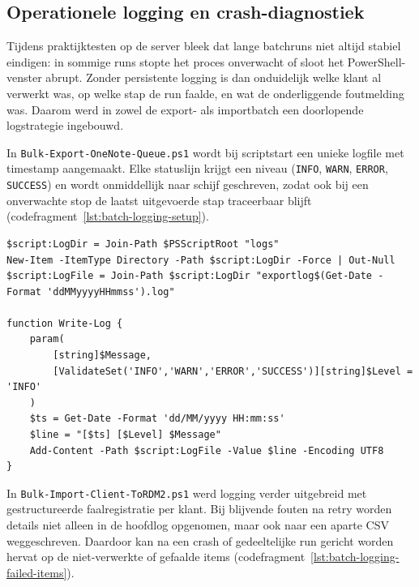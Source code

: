 \subsection{Operationele logging en crash-diagnostiek}
\label{subsec:topic-logging-crash}

Tijdens praktijktesten op de server bleek dat lange batchruns niet altijd stabiel eindigen: in sommige runs stopte het proces onverwacht of sloot het PowerShell-venster abrupt. Zonder persistente logging is dan onduidelijk welke klant al verwerkt was, op welke stap de run faalde, en wat de onderliggende foutmelding was. Daarom werd in zowel de export- als importbatch een doorlopende logstrategie ingebouwd.

In \texttt{Bulk-Export-OneNote-Queue.ps1} wordt bij scriptstart een unieke logfile met timestamp aangemaakt. Elke statuslijn krijgt een niveau (\texttt{INFO}, \texttt{WARN}, \texttt{ERROR}, \texttt{SUCCESS}) en wordt onmiddellijk naar schijf geschreven, zodat ook bij een onverwachte stop de laatst uitgevoerde stap traceerbaar blijft (codefragment~\ref{lst:batch-logging-setup}).

\begin{listing}[htbp]
\begin{lstlisting}
$script:LogDir = Join-Path $PSScriptRoot "logs"
New-Item -ItemType Directory -Path $script:LogDir -Force | Out-Null
$script:LogFile = Join-Path $script:LogDir "exportlog$(Get-Date -Format 'ddMMyyyyHHmmss').log"

function Write-Log {
    param(
        [string]$Message,
        [ValidateSet('INFO','WARN','ERROR','SUCCESS')][string]$Level = 'INFO'
    )
    $ts = Get-Date -Format 'dd/MM/yyyy HH:mm:ss'
    $line = "[$ts] [$Level] $Message"
    Add-Content -Path $script:LogFile -Value $line -Encoding UTF8
}
\end{lstlisting}
\caption{Persistente logfile met niveaus in \texttt{Bulk-Export-OneNote-Queue.ps1}}
\label{lst:batch-logging-setup}
\end{listing}

In \texttt{Bulk-Import-Client-ToRDM2.ps1} werd logging verder uitgebreid met gestructureerde faalregistratie per klant. Bij blijvende fouten na retry worden details niet alleen in de hoofdlog opgenomen, maar ook naar een aparte CSV weggeschreven. Daardoor kan na een crash of gedeeltelijke run gericht worden hervat op de niet-verwerkte of gefaalde items (codefragment~\ref{lst:batch-logging-failed-items}).

